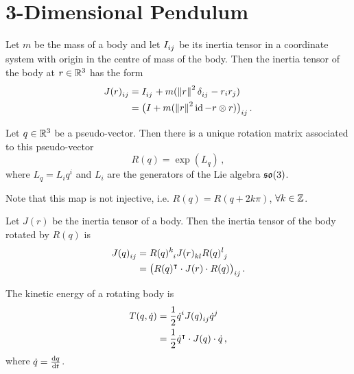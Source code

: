 \chapter{3-Dimensional Pendulum}

\begin{thm}
    Let $m$ be the mass of a body and let $I\indices{_i_j}$ be its inertia tensor in a coordinate system with origin in the centre of mass of the body. Then the inertia tensor of the body at $r \in \mathbb{R}^3$ has the form
    \begin{align*}
        J(r)\indices{_i_j} &= I\indices{_i_j} + m(\norm{r}^2 \kronecker\indices{_i_j} - r_i r_j) \\
                           &= \big( I + m(\norm{r}^2 \id - r \otimes r) \big)\indices{_i_j} \,.
    \end{align*}
\end{thm}

\begin{lem}\label{lem_rotation_matrix}
    Let $q \in \mathbb{R}^3$ be a pseudo-vector. Then there is a unique rotation matrix associated to this pseudo-vector
    \begin{equation*}
        R(q) = \exp(L_q) \,,
    \end{equation*}
    where $L_q = L_i q^i$ and $L_i$ are the generators of the Lie algebra $\mathfrak{so}(3)$.
\end{lem}

\begin{rem}
    Note that this map is not injective, i.e. $R(q) = R(q+2k\pi)$, $\forall k \in \mathbb{Z}$.
\end{rem}

\begin{lem}\label{lem_rotation_of_inertia_tensor}
    Let $J(r)$ be the inertia tensor of a body. Then the inertia tensor of the body rotated by $R(q)$ is
    \begin{align*}
        J(q)\indices{_i_j} &= R(q)\indices{^k_i} J(r)\indices{_k_l} R(q)\indices{^l_j} \\
                           &= \big( R(q)^\transpose \cdot J(r) \cdot R(q) \big)\indices{_i_j} \,.
    \end{align*}
\end{lem}

\begin{lem}\label{lem_kinetic_energy}
    The kinetic energy of a rotating body is
    \begin{align*}
        T(q, \dot{q}) &= \frac{1}{2} \dot{q}^i J(q)\indices{_i_j} \dot{q}^j \\
                      &= \frac{1}{2} \dot{q}^\transpose \cdot J(q) \cdot \dot{q} \,,
    \end{align*}
    where $\dot{q} = \frac{\operatorname{d\!} q}{\operatorname{d\!} t}$.
\end{lem}

